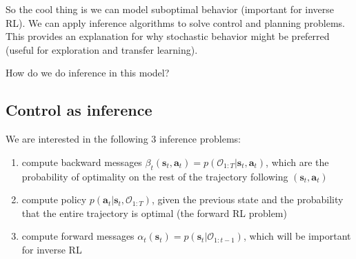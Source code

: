 \documentclass{report}
\begin{document}
So the cool thing is we can model suboptimal behavior (important for inverse RL).
We can apply inference algorithms to solve control and planning problems.
This provides an explanation for why stochastic behavior might be preferred (useful for exploration and transfer learning).

How do we do inference in this model?

\subsection{Control as inference}
We are interested in the following 3 inference problems:
\begin{enumerate}
		\item compute backward messages $ \beta_{ t } (\bm{s}_{t}, \bm{a}_{t} ) = p (\mathcal{O}_{ 1:T }| \bm{s}_{t}, \bm{a}_{t}) $,
				which are the probability of optimality on the rest of the trajectory following $ (\bm{s}_{t}, \bm{a}_{t} )  $
		\item compute policy $ p (\bm{a}_{t} | \bm{s}_{t}, \mathcal{O}_{ 1:T })   $,
				given the previous state and the probability that the entire trajectory is optimal (the forward RL problem)
		\item compute forward messages $ \alpha_{ t } (\bm{s}_{t}) = p (\bm{s}_{t}|\mathcal{O}_{ 1:t-1 })  $, which
				will be important for inverse RL
\end{enumerate}
\end{document}
